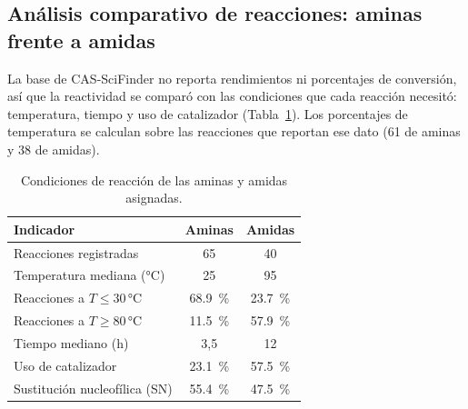 
\subsection{Análisis comparativo de reacciones: aminas frente a amidas}
\label{sec:analisis-reacciones}
La base de CAS-SciFinder no reporta rendimientos ni porcentajes de
conversión, así que la reactividad se comparó con las condiciones que cada
reacción necesitó: temperatura, tiempo y uso de catalizador
(Tabla~\ref{tab:reacciones}). Los porcentajes de temperatura se calculan
sobre las reacciones que reportan ese dato (61 de aminas y 38 de amidas).

\begin{table}[htbp]
	\centering
	\captionsetup{width=\columnwidth, justification=justified}
	\caption{Condiciones de reacción de las aminas y amidas asignadas.}
	\label{tab:reacciones}
	\small
	\begin{tabular}{lcc}
		\toprule
		\textbf{Indicador} & \textbf{Aminas} & \textbf{Amidas} \\
		\midrule
		Reacciones registradas                     & 65          & 40          \\
		Temperatura mediana (\si{\degreeCelsius})  & 25          & 95          \\
		Reacciones a $T \le 30$\,\si{\degreeCelsius} & \SI{68.9}{\percent} & \SI{23.7}{\percent} \\
		Reacciones a $T \ge 80$\,\si{\degreeCelsius} & \SI{11.5}{\percent} & \SI{57.9}{\percent} \\
		Tiempo mediano (h)                         & 3,5         & 12          \\
		Uso de catalizador                         & \SI{23.1}{\percent} & \SI{57.5}{\percent} \\
		Sustitución nucleofílica (SN)              & \SI{55.4}{\percent} & \SI{47.5}{\percent} \\
		\bottomrule
	\end{tabular}
\end{table}

